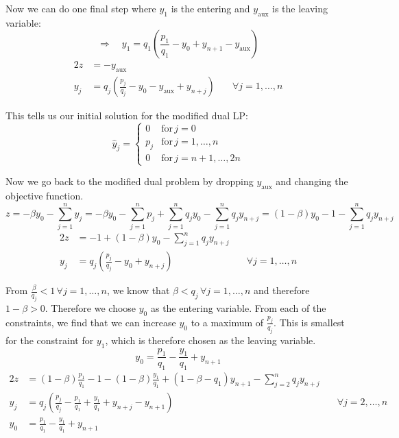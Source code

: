 \documentclass[a4paper,12pt,headsepline]{scrartcl}
\begin{document}
Now we can do one final step where $y_1$ is the entering and $y_\text{aux}$ is the leaving variable:
\[ \Rightarrow\quad y_1 = q_1\left(\frac{p_1}{q_1}-y_0+y_{n+1}-y_\text{aux}\right) \]
\begin{alignat*}{2}
  z            &= -y_\text{aux} \\
  y_j      &= q_j\left(\frac{p_j}{q_j}-y_0-y_\text{aux}+y_{n+j}\right) & \quad\forall j=1,\dots,n
\end{alignat*}

This tells us our initial solution for the modified dual LP:
\[ \hat{y}_j = \begin{cases}0&\text{for}\,j=0\\ p_j&\text{for}\,j=1,\dots,n\\0&\text{for}\,j=n+1,\dots,2n\end{cases} \]

Now we go back to the modified dual problem by dropping $y_\text{aux}$ and changing the objective function.
\[ z = -\beta y_0-\sum_{j=1}^n y_j = -\beta y_0 -\sum_{j=1}^n p_j +\sum_{j=1}^n q_jy_0 -\sum_{j=1}^n q_jy_{n+j} = (1-\beta)y_0-1-\sum_{j=1}^n q_jy_{n+j} \]
\begin{alignat*}{2}
  z   &= -1+(1-\beta)y_0-\sum_{j=1}^n q_jy_{n+j} \\
  y_j &= q_j\left(\frac{p_j}{q_j}-y_0+y_{n+j}\right) & \quad\forall j=1,\dots,n
\end{alignat*}

From $\frac{\beta}{q_j}<1\,\forall j=1,\dots,n$, we know that $\beta<q_j\,\forall j=1,\dots,n$ and therefore $1-\beta>0$.
Therefore we choose $y_0$ as the entering variable.
From each of the constraints, we find that we can increase $y_0$ to a maximum of $\frac{p_j}{q_j}$.
This is smallest for the constraint for $y_1$, which is therefore chosen as the leaving variable.
\[ y_0 = \frac{p_1}{q_1}-\frac{y_1}{q_1}+y_{n+1} \]
\begin{alignat*}{2}
  z   &= (1-\beta)\frac{p_1}{q_1}-1-(1-\beta)\frac{y_1}{q_1}+(1-\beta-q_1)y_{n+1}-\sum_{j=2}^n q_jy_{n+j} \\
	y_j &= q_j\left(\frac{p_j}{q_j}-\frac{p_1}{q_1}+\frac{y_1}{q_1}+y_{n+j}-y_{n+1}\right) & \quad\forall j=2,\dots,n \\
	y_0 &= \frac{p_1}{q_1}-\frac{y_1}{q_1}+y_{n+1}
\end{alignat*}
\end{document}
